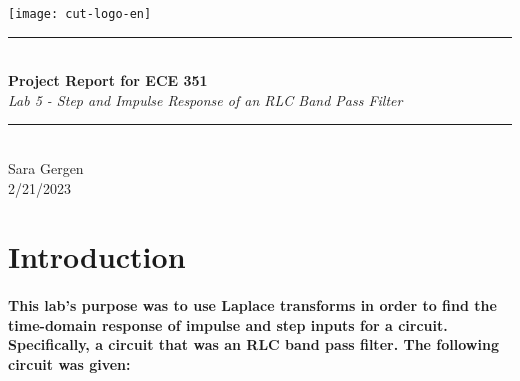 \documentclass[12pt,a4paper]{article}
\newcommand{\HRule}{\rule{\linewidth}{0.5mm}}
\begin{document}
\begin{titlepage}
\begin{center}

\texttt{[image: cut-logo-en]}~\\[2cm]


\HRule \\[0.4cm]
{ \LARGE 
  \textbf{Project Report for ECE 351}\\[0.4cm]
  \emph{Lab 5 - Step and Impulse Response of an RLC Band Pass Filter}\\[0.4cm]
}
\HRule \\[1.5cm]



{ \large
  Sara Gergen \\[0.1cm]
  2/21/2023\\[0.1cm]
}

\vfill



\end{center}
\end{titlepage}


\newpage



\tableofcontents
{}
\newpage
\setcounter{page}{1}

\section{Introduction}\label{sec:intro}


\paragraph{This lab's purpose was to use Laplace transforms in order to find the time-domain response of impulse and step inputs for a circuit. Specifically, a circuit that was an RLC band pass filter. The following circuit was given:}
\end{document}
